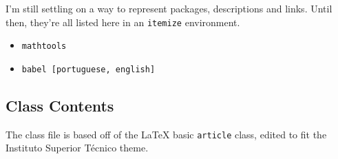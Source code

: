 \documentclass{ist-report}
\newcommand*{\package}[1]{\texttt{#1}}
\begin{document}
I'm still settling on a way to represent packages, descriptions and links. Until then, they're all listed here in an \texttt{itemize} environment.
\begin{itemize}
	\item \package{mathtools}
	\item \package{babel [portuguese, english]}
\end{itemize}

\subsection{Class Contents}

The class file is based off of the \LaTeX{} basic \package{article} class, edited to fit the Instituto Superior Técnico theme.

\pagebreak

\end{document}
